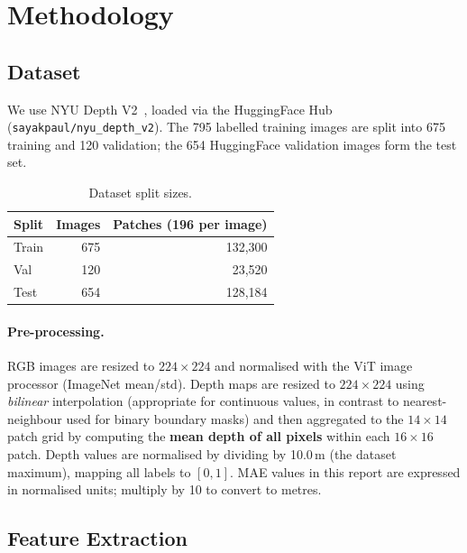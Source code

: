 \documentclass[11pt,a4paper]{article}
\begin{document}
\section{Methodology}

\subsection{Dataset}

We use NYU Depth V2~\cite{silberman2012nyudepth}, loaded via the HuggingFace
Hub (\texttt{sayakpaul/nyu\_depth\_v2}).  The 795 labelled training images
are split into 675 training and 120 validation; the 654 HuggingFace validation
images form the test set.

\begin{table}[H]
\centering
\caption{Dataset split sizes.}
\begin{tabular}{lrr}
\toprule
Split & Images & Patches (196 per image) \\
\midrule
Train & 675 & 132,300 \\
Val   & 120 & 23,520 \\
Test  & 654 & 128,184 \\
\bottomrule
\end{tabular}
\label{tab:splits}
\end{table}

\paragraph{Pre-processing.}
RGB images are resized to $224\!\times\!224$ and normalised with the ViT
image processor (ImageNet mean/std).  Depth maps are resized to
$224\!\times\!224$ using \emph{bilinear} interpolation (appropriate for
continuous values, in contrast to nearest-neighbour used for binary boundary
masks) and then aggregated to the $14\!\times\!14$ patch grid by computing
the \textbf{mean depth of all pixels} within each $16\!\times\!16$ patch.
Depth values are normalised by dividing by 10.0\,m (the dataset maximum),
mapping all labels to $[0,1]$.  MAE values in this report are expressed in
normalised units; multiply by 10 to convert to metres.

\subsection{Feature Extraction}
\end{document}

